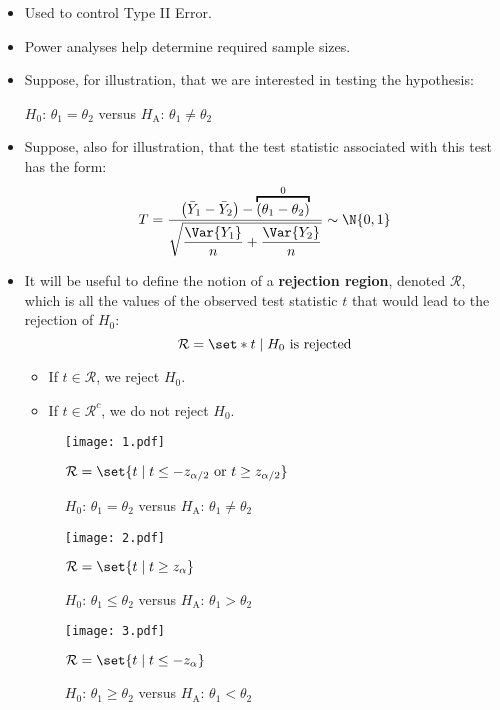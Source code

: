 \begin{itemize}
      \item Used to control Type II Error.
      \item Power analyses help determine required sample sizes.
      \item Suppose, for illustration, that we are interested in testing the hypothesis:

            \centerline{$ H_0 $: $ \theta_1=\theta_2 $ versus $ H_\text{A} $: $ \theta_1\ne \theta_2 $}
      \item Suppose, also for illustration, that the test statistic associated with this test has
            the form:
            \[ T=\frac{\bigl(\bar{Y}_1-\bar{Y}_2\bigr)-\overbracket{(\theta_1-\theta_2)}^0}{\displaystyle \sqrt{\frac{\Var{Y_1}}{n}+\frac{\Var{Y_2}}{n} }}\sim \N{0,1}  \]
      \item It will be useful to define the notion of a \textbf{rejection region}, denoted $ \mathcal{R} $,
            which is all the values of the observed test statistic $ t $ that would lead to the rejection
            of $ H_0 $:
            \[ \mathcal{R}=\set*{t\mid H_0\text{ is rejected}} \]
            \begin{itemize}
                  \item If $ t\in\mathcal{R} $, we reject $ H_0 $.
                  \item If $ t\in\mathcal{R}^c $, we do not reject $ H_0 $.
            \end{itemize}
            \begin{figure}[!htbp]
                  \centering
                  \texttt{[image: 1.pdf]}
                  \caption{$ H_0 $: $ \theta_1=\theta_2 $ versus $ H_\text{A} $: $ \theta_1\ne \theta_2 $}{$ \mathcal{R}=\set{t\mid t\le -z_{\alpha/2}\text{ or }t\ge z_{\alpha/2}} $}
            \end{figure}
            \begin{figure}[!htbp]
                  \centering
                  \texttt{[image: 2.pdf]}
                  \caption{$ H_0 $: $ \theta_1\le\theta_2 $ versus $ H_\text{A} $: $ \theta_1>\theta_2 $}{$ \mathcal{R}=\set{t\mid t\ge z_{\alpha}} $}
            \end{figure}
            \begin{figure}[!htbp]
                  \centering
                  \texttt{[image: 3.pdf]}
                  \caption{$ H_0 $: $ \theta_1\ge\theta_2 $ versus $ H_\text{A} $: $ \theta_1<\theta_2 $}{$ \mathcal{R}=\set{t\mid t\le -z_{\alpha}} $}
            \end{figure}
\end{itemize}
